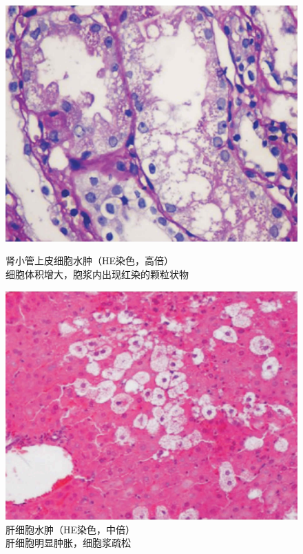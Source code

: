 \begin{figure}[!htbp]
	\centering
	\begin{minipage}[b]{0.45\textwidth}
		\includegraphics{./images/Image00007.jpg}
		\caption{肾小管上皮细胞水肿（HE染色，高倍） \\ {\small 细胞体积增大，胞浆内出现红染的颗粒状物}}
		\label{fig1-6}
	\end{minipage}
	\hspace{0.04\textwidth}%
	\begin{minipage}[b]{0.45\textwidth}
		\includegraphics{./images/Image00008.jpg}
		\caption{肝细胞水肿（HE染色，中倍） \\ {\small 肝细胞明显肿胀，细胞浆疏松}}
		\label{fig1-7}
	\end{minipage}
\end{figure}

